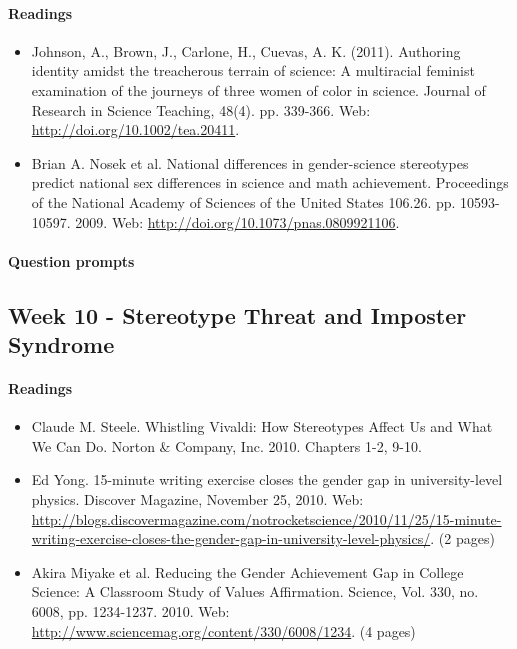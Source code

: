 \documentclass{article}
\begin{document}
\paragraph{Readings}
\begin{itemize}
\item Johnson, A., Brown, J., Carlone, H., Cuevas, A. K. (2011). Authoring identity amidst the treacherous terrain of science: A multiracial feminist examination of the  journeys of three women of color in science. Journal of Research in Science Teaching, 48(4).  pp. 339-366. Web: \url{http://doi.org/10.1002/tea.20411}.
\item Brian A. Nosek et al. National differences in gender-science stereotypes predict national sex differences in science and math achievement. Proceedings of the National Academy of Sciences of the United States 106.26. pp. 10593-10597. 2009. Web: \url{http://doi.org/10.1073/pnas.0809921106}.
\end{itemize}
\paragraph{Question prompts}


\subsection{Week 10 - Stereotype Threat and Imposter Syndrome}
\paragraph{Readings}
\begin{itemize}
\item Claude M. Steele. Whistling Vivaldi: How Stereotypes Affect Us and What We Can Do. Norton \& Company, Inc. 2010. Chapters 1-2, 9-10.
\item Ed Yong. 15-minute writing exercise closes the gender gap in university-level physics. Discover Magazine, November 25, 2010. Web: \url{http://blogs.discovermagazine.com/notrocketscience/2010/11/25/15-minute-writing-exercise-closes-the-gender-gap-in-university-level-physics/}. (2 pages)
\item Akira Miyake et al. Reducing the Gender Achievement Gap in College Science: A Classroom Study of Values Affirmation. Science, Vol. 330, no. 6008, pp. 1234-1237. 2010. Web: \url{http://www.sciencemag.org/content/330/6008/1234}. (4 pages)
\end{itemize}
\end{document}
